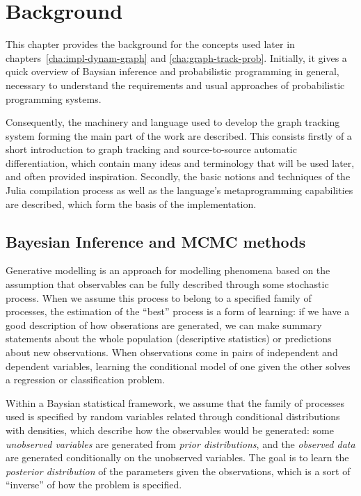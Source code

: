 \chapter{Background}
\label{cha:background}

This chapter provides the background for the concepts used later in
chapters~\ref{cha:impl-dynam-graph} and \ref{cha:graph-track-prob}.  Initially, it gives a quick
overview of Baysian inference and probabilistic programming in general, necessary to understand the
requirements and usual approaches of probabilistic programming systems.

Consequently, the machinery and language used to develop the graph tracking system forming the main
part of the work are described.  This consists firstly of a short introduction to graph tracking and
source-to-source automatic differentiation, which contain many ideas and terminology that will be
used later, and often provided inspiration.  Secondly, the basic notions and techniques of the Julia
compilation process as well as the language's metaprogramming capabilities are described, which form
the basis of the implementation.


\section{Bayesian Inference and MCMC methods}
\label{sec:bayes-infer}

Generative modelling is an approach for modelling phenomena based on the assumption that
observables can be fully described through some stochastic process.  When we assume this process to
belong to a specified family of processes, the estimation of the \enquote{best} process is a form of
learning: if we have a good description of how obserations are generated, we can make summary
statements about the whole population (descriptive statistics) or predictions about new
observations.  When observations come in pairs of independent and dependent variables, learning the
conditional model of one given the other solves a regression or classification problem.

Within a Baysian statistical framework, we assume that the family of processes used is specified by
random variables related through conditional distributions with densities, which describe how the
observables would be generated: some \emph{unobserved variables} are generated from \emph{prior
  distributions}, and the \emph{observed data} are generated conditionally on the unobserved
variables.  The goal is to learn the \emph{posterior distribution} of the parameters given the
observations, which is a sort of \enquote{inverse} of how the problem is specified.

